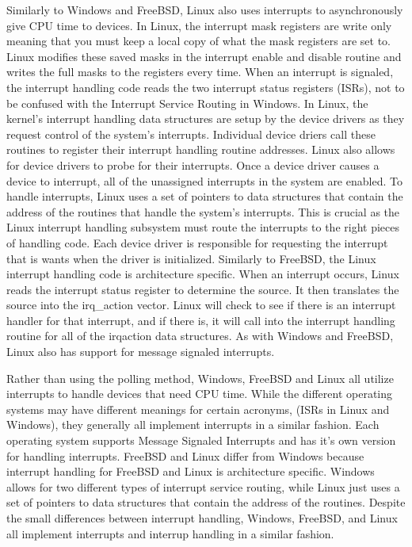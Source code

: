 \documentclass[letterpaper,10pt,draftclsnofoot,onecolumn,titlepage]{IEEEtran}
\begin{document}
		Similarly to Windows and FreeBSD, Linux also uses interrupts to asynchronously give CPU time to devices.
		In Linux, the interrupt mask registers are write only meaning that you must keep a local copy of what the mask registers are set to.
		Linux modifies these saved masks in the interrupt enable and disable routine and writes the full masks to the registers every time.
		When an interrupt is signaled, the interrupt handling code reads the two interrupt status registers (ISRs), not to be confused with the Interrupt Service Routing in Windows.
		In Linux, the kernel's interrupt handling data structures are setup by the device drivers as they request control of the system's interrupts.
		Individual device driers call these routines to register their interrupt handling routine addresses.
		Linux also allows for device drivers to probe for their interrupts. Once a device driver causes a device to interrupt, all of the unassigned interrupts in the system are enabled.
		To handle interrupts, Linux uses a set of pointers to data structures that contain the address of the routines that handle the system's interrupts.
		This is crucial as the Linux interrupt handling subsystem must route the interrupts to the right pieces of handling code.
		Each device driver is responsible for requesting the interrupt that is wants when the driver is initialized.
		Similarly to FreeBSD, the Linux interrupt handling code is architecture specific.
		When an interrupt occurs, Linux reads the interrupt status register to determine the source. It then translates the source into the irq_action vector.
		Linux will check to see if there is an interrupt handler for that interrupt, and if there is, it will call into the interrupt handling routine for all of the irqaction data structures.
		As with Windows and FreeBSD, Linux also has support for message signaled interrupts.

		Rather than using the polling method, Windows, FreeBSD and Linux all utilize interrupts to handle devices that need CPU time.
		While the different operating systems may have different meanings for certain acronyms, (ISRs in Linux and Windows), they generally all implement interrupts in a similar fashion.
		Each operating system supports Message Signaled Interrupts and has it's own version for handling interrupts.
		FreeBSD and Linux differ from Windows because interrupt handling for FreeBSD and Linux is architecture specific.
		Windows allows for two different types of interrupt service routing, while Linux just uses a set of pointers to data structures that contain the address of the routines.
		Despite the small differences between interrupt handling, Windows, FreeBSD, and Linux all implement interrupts and interrup handling in a similar fashion.
\end{document}
